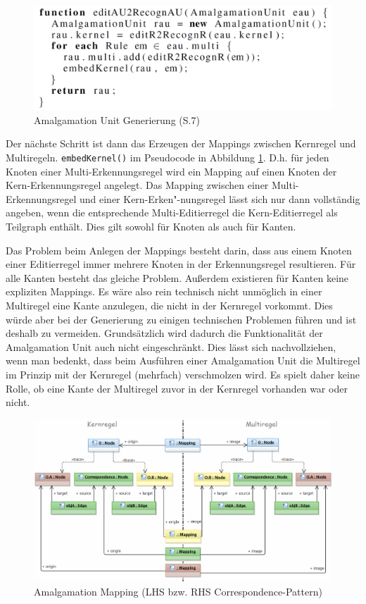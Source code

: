 \begin{figure}[htbp]
  \centering
  \includegraphics[scale=0.18]{images/amalgamation_code.png}
  \caption{Amalgamation Unit Generierung \cite{KeKT2011ASE} (S.7)}
  \label{fig:amalgamtion_code}
\end{figure}

Der nächste Schritt ist dann das Erzeugen der Mappings zwischen Kernregel und Multiregeln.
\texttt{embedKernel()} im Pseudocode in Abbildung \ref{fig:amalgamtion_code}. D.h.
für jeden Knoten einer Multi-Erkennungsregel wird ein Mapping auf einen Knoten der
Kern-Erkennungsregel angelegt. Das Mapping zwischen einer Multi-Erkennungsregel und einer
Kern-Erken"-nungsregel lässt sich nur dann vollständig angeben, wenn die entsprechende
Multi-Editierregel die Kern-Editierregel als Teilgraph enthält. Dies gilt sowohl für Knoten als
auch für Kanten.

Das Problem beim Anlegen der Mappings besteht darin, dass aus einem Knoten einer Editierregel immer
mehrere Knoten in der Erkennungsregel resultieren. Für alle Kanten besteht das gleiche Problem.
Außerdem existieren für Kanten keine expliziten Mappings. Es wäre also rein technisch nicht
unmöglich in einer Multiregel eine Kante anzulegen, die nicht in der Kernregel vorkommt. Dies würde
aber bei der Generierung zu einigen technischen Problemen führen und ist deshalb zu vermeiden.
Grundsätzlich wird dadurch die Funktionalität der Amalgamation Unit auch nicht eingeschränkt. Dies
lässt sich nachvollziehen, wenn man bedenkt, dass beim Ausführen einer Amalgamation Unit die
Multiregel im Prinzip mit der Kernregel (mehrfach) verschmolzen wird. Es spielt daher keine Rolle,
ob eine Kante der Multiregel zuvor in der Kernregel vorhanden war oder nicht.

\begin{figure}[htbp]
  \centering
  \includegraphics[width=1.0\textwidth]{images/amalgamation_mapping.png}
  \caption{Amalgamation Mapping (LHS bzw. RHS Correspondence-Pattern)}
  \label{fig:amalgamation_mapping}
\end{figure}

